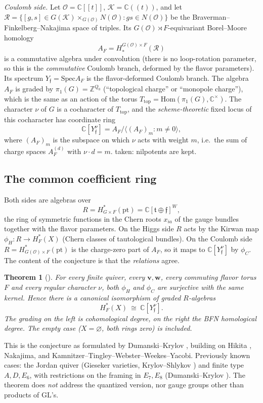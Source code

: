 \documentclass[11pt]{amsart}
\newtheorem{theorem}{Theorem}[section]
\theoremstyle{remark}
\newcommand{\C}{\mathbb{C}}
\newcommand{\Z}{\mathbb{Z}}
\newcommand{\OO}{\mathcal{O}}
\newcommand{\KK}{\mathcal{K}}
\newcommand{\GL}{\mathrm{GL}}
\newcommand{\Hom}{\mathrm{Hom}}
\newcommand{\Spec}{\mathrm{Spec}}
\newcommand{\bv}{\mathbf{v}}
\newcommand{\bw}{\mathbf{w}}
\newcommand{\Ttop}{T_{\mathrm{top}}}
\newcommand{\Hc}{H^*_F(X)}
\begin{document}
\emph{Coulomb side.}  Let $\OO=\C[[t]]$, $\KK=\C((t))$, and let
$\mathcal R=\{[g,s]\in G(\KK)\times_{G(\OO)}N(\OO): gs\in N(\OO)\}$ be the
Braverman--Finkelberg--Nakajima space of triples.  Its
$G(\OO)\rtimes F$-equivariant Borel--Moore homology
\[
 A_F=H_*^{G(\OO)\times F}(\mathcal R)
\]
is a commutative algebra under convolution (there is no loop-rotation
parameter, so this is the \emph{commutative} Coulomb branch, deformed by
the flavor parameters).  Its spectrum $Y_{\mathfrak f}=\Spec A_F$ is the
flavor-deformed Coulomb branch.  The algebra $A_F$ is graded by
$\pi_1(G)=\Z^{Q_0}$ (``topological charge'' or ``monopole charge''), which
is the same as an action of the torus $\Ttop=\Hom(\pi_1(G),\C^\times)$.
The character $\nu$ of $G$ is a cocharacter of $\Ttop$, and the
\emph{scheme-theoretic} fixed locus of this cocharacter has coordinate ring
\[
 \C[Y_{\mathfrak f}^\nu]=A_F\big/\big\langle (A_F)_m : m\neq 0\big\rangle,
\]
where $(A_F)_m$ is the subspace on which $\nu$ acts with weight $m$, i.e.\
the sum of charge spaces $A_F^{(d)}$ with $\nu\cdot d=m$.  
taken: nilpotents are kept.

\subsection{The common coefficient ring}
Both sides are algebras over
\[
 R=H^*_{G\times F}(\mathrm{pt})=\C[\mathfrak t\oplus\mathfrak f]^W,
\]
the ring of symmetric functions in the Chern roots $x_{ia}$ of the gauge
bundles together with the flavor parameters.  On the Higgs side $R$ acts by
the Kirwan map $\phi_H:R\to \Hc$ (Chern classes of tautological
bundles).  On the Coulomb side $R=H^*_{G(\OO)\times F}(\mathrm{pt})$ is the
charge-zero part of $A_F$, so it maps to $\C[Y_{\mathfrak f}^\nu]$ by
$\phi_C$.  The content of the conjecture is that the \emph{relations}
agree.

\begin{theorem}[{\cite[Theorem~1.1]{OAI-Hikita}}]\label{thm:main}
For every finite quiver, every $\bv,\bw$, every commuting flavor torus $F$
and every regular character $\nu$, both $\phi_H$ and $\phi_C$ are
surjective with the same kernel.  Hence there is a canonical isomorphism of
graded $R$-algebras
\[
 \Hc\ \cong\ \C[Y_{\mathfrak f}^\nu].
\]
The grading on the left is cohomological degree, on the right the BFN
homological degree.  The empty case ($X=\varnothing$, both rings zero) is
included.
\end{theorem}

This is the conjecture as formulated by Dumanski--Krylov
\cite[Conj.~2.1, eq.~(2.3)]{DK25}, building on Hikita \cite{Hikita17},
Nakajima, and Kamnitzer--Tingley--Webster--Weekes--Yacobi.  Previously known cases:
the Jordan quiver (Gieseker varieties, Krylov--Shlykov \cite{KS25}) and
finite type $A,D,E_6$, with restrictions on the framing in $E_7,E_8$
(Dumanski--Krylov \cite{DK25}).  The theorem does \emph{not} address the
quantized version, nor gauge groups other than products of $\GL$'s.
\end{document}
